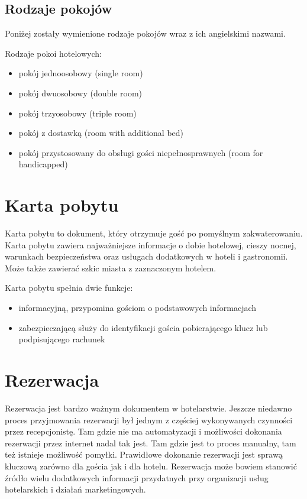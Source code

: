 \documentclass[a4paper,onecolumn,oneside,11pt,wide,floatssmall]{mwrep}
\theoremstyle{definition}
\theoremstyle{plain}%
\theoremstyle{remark}
\begin{document}
\subsection{Rodzaje pokojów}
Poniżej zostały wymienione rodzaje pokojów wraz z ich angielskimi nazwami.

Rodzaje pokoi hotelowych:
\begin{itemize}
  \item pokój jednoosobowy (single room)
  \item pokój dwuosobowy (double room)
  \item pokój trzyosobowy (triple room)
  \item pokój z dostawką (room with additional bed)
  \item pokój przystosowany do obsługi gości niepełnosprawnych (room for 
  handicapped)
\end{itemize}

\section{Karta pobytu}
Karta pobytu to dokument, który otrzymuje gość po pomyślnym zakwaterowaniu. 
Karta pobytu zawiera najważniejsze informacje o dobie hotelowej, cieszy 
nocnej, warunkach bezpieczeństwa oraz usługach dodatkowych w hoteli i 
gastronomii. Może także zawierać szkic miasta z zaznaczonym hotelem.

Karta pobytu spełnia dwie funkcje:
\begin{itemize}
  \item{informacyjną}, przypomina gościom o podstawowych informacjach
  \item{zabezpieczającą} służy do identyfikacji gościa pobierającego klucz 
  lub podpisującego rachunek
\end{itemize}

\section{Rezerwacja}
Rezerwacja jest bardzo ważnym dokumentem w hotelarstwie. Jeszcze niedawno 
proces przyjmowania rezerwacji był jednym z częściej wykonywanych czynności 
przez recepcjonistę. Tam gdzie nie ma automatyzacji i możliwości dokonania 
rezerwacji przez internet nadal tak jest. Tam gdzie jest to proces manualny, 
tam też istnieje możliwość pomyłki. Prawidłowe dokonanie rezerwacji jest 
sprawą kluczową zarówno dla gościa jak i dla hotelu. Rezerwacja może bowiem 
stanowić źródło wielu dodatkowych informacji przydatnych przy organizacji 
usług hotelarskich i działań marketingowych.
\end{document}
